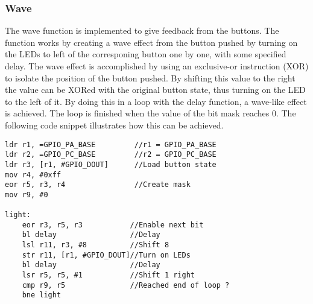 \subsubsection{Wave}
The wave function is implemented to give feedback from the buttons. The function works by creating a wave effect from the button pushed by turning on the LEDs to left of the corresponing button one by one, with some specified delay. The wave effect is accomplished by using an exclusive-or instruction (XOR) to isolate the position of the button pushed. By shifting this value to the right the value can be XORed with the original button state, thus turning on the LED to the left of it. By doing this in a loop with the delay function, a wave-like effect is achieved. The loop is finished when the value of the bit mask reaches 0. The following code snippet illustrates how this can be achieved. 

\begin{lstlisting}
ldr r1, =GPIO_PA_BASE         //r1 = GPIO_PA_BASE
ldr r2, =GPIO_PC_BASE         //r2 = GPIO_PC_BASE
ldr r3, [r1, #GPIO_DOUT]      //Load button state
mov r4, #0xff               
eor r5, r3, r4                //Create mask 
mov r9, #0

light:
    eor r3, r5, r3           //Enable next bit  
    bl delay                 //Delay
    lsl r11, r3, #8          //Shift 8   
    str r11, [r1, #GPIO_DOUT]//Turn on LEDs 
    bl delay                 //Delay
    lsr r5, r5, #1           //Shift 1 right 
    cmp r9, r5               //Reached end of loop ? 
    bne light
\end{lstlisting}